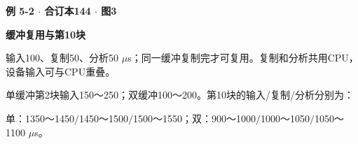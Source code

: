 {\color{ink}\bfseries 例 5-2 \(\cdot \) 合订本144 \(\cdot \) 图3}\par \textbf{缓冲复用与第10块}\par\vspace{2bp}输入100、复制50、分析50 \(\mu \)s；同一缓冲复制完才可复用。复制和分析共用CPU，设备输入可与CPU重叠。\par 单缓冲第2块输入150～250；双缓冲100～200。第10块的输入/\allowbreak{}复制/\allowbreak{}分析分别为：\par 单：1350～1450\(/\allowbreak{}\)1450～1500\(/\allowbreak{}\)1500～1550；双：900～1000\(/\allowbreak{}\)1000～1050\(/\allowbreak{}\)1050～1100 \(\mu \)s。
